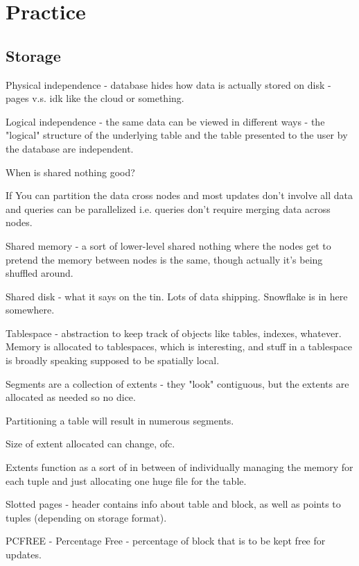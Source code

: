 \documentclass{article}
\begin{document}
				
\newpage\phantom{asd}
\newpage

\section{Practice}

	\subsection{Storage}

		Physical independence - database hides how data is actually stored on disk - pages v.s. idk like the cloud or something.
		
		Logical independence - the same data can be viewed in different ways - the "logical" structure of the underlying table and the table presented to the user by the database are independent.
		
		When is shared nothing good?
		
		If You can partition the data cross nodes and most updates don't involve all data and queries can be parallelized i.e. queries don't require merging data across nodes.
		
		Shared memory - a sort of lower-level shared nothing where the nodes get to pretend the memory between nodes is the same, though actually it's being shuffled around.
		
		Shared disk - what it says on the tin. Lots of data shipping. Snowflake is in here somewhere.
		
		Tablespace - abstraction to keep track of objects like tables, indexes, whatever. Memory is allocated to tablespaces, which is interesting, and stuff in a tablespace is broadly speaking supposed to be spatially local.
		
		Segments are a collection of extents - they "look" contiguous, but the extents are allocated as needed so no dice.
		
		Partitioning a table will result in numerous segments.
		
		Size of extent allocated can change, ofc.
		
		Extents function as a sort of in between of individually managing the memory for each tuple and just allocating one huge file for the table.
		
		Slotted pages - header contains info about table and block, as well as points to tuples (depending on storage format).
		
		PCFREE - Percentage Free - percentage of block that is to be kept free for updates.
		
\end{document}
